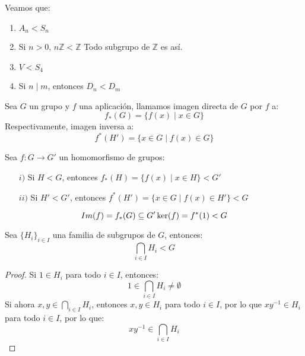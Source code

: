 \begin{ejemplo}
    Veamos que:
    \begin{enumerate}
        \item $A_n < S_n$
        \item Si $n>0$, $n\mathbb{Z} < \mathbb{Z}$ Todo subgrupo de $\mathbb{Z}$ es así. %
        \item $V<S_4$ %
        \item Si $n\mid m$, entonces $D_n < D_m$
    \end{enumerate}
\end{ejemplo}

\begin{definicion}
    Sea $G$ un grupo y $f$ una aplicación, llamamos imagen directa de $G$ por $f$ a:
    \begin{equation*}
        f_\ast(G) = \{f(x) \mid x \in G\}
    \end{equation*}
    Respectivamente, imagen inversa a:
    \begin{equation*}
        f^\ast(H') = \{x\in G \mid f(x) \in  G\}
    \end{equation*}
\end{definicion}

\begin{prop}
    Sea $f:G\to G'$ un homomorfismo de grupos: 
    \begin{enumerate}
        \item[$i)$] Si $H<G$, entonces $f_\ast(H) = \{f(x) \mid x\in H\}< G'$ 
        \item[$ii)$] Si $H'<G'$, entonces $f^\ast(H') = \{x\in G\mid f(x) \in H'\}< G$
    \end{enumerate}
    \begin{equation*}
        Im(f) = f_\ast(G)\subseteq G' \\
        \ker(f) = f^\ast(1) < G
    \end{equation*}
\end{prop}

\begin{prop}
    Sea $\{H_i\}_{i \in I}$ una familia de subgrupos de $G$, entonces:
    \begin{equation*}
        \bigcap_{i \in I} H_i < G
    \end{equation*}
    \begin{proof}
        Si $1\in H_i$ para todo $i \in I$, entonces:
        \begin{equation*}
            1 \in \bigcap_{i \in I} H_i \neq \emptyset 
        \end{equation*}
        Si ahora $x,y\in \bigcap_{i \in I} H_i$, entonces $x,y \in H_i$ para todo $i \in I$, por lo que $xy^{-1}\in H_i$ para todo $i \in I$, por lo que:
        \begin{equation*}
            xy^{-1} \in \bigcap_{i \in I}H_i
        \end{equation*}
    \end{proof}
\end{prop}

